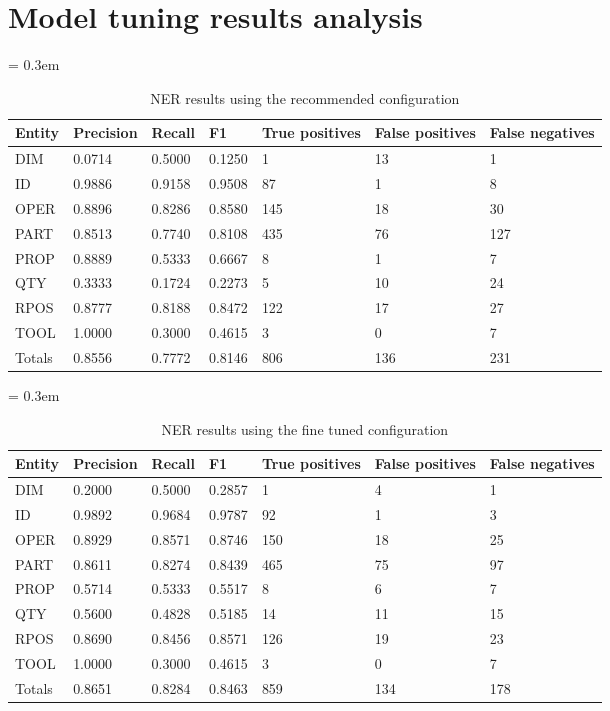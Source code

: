 \section{Model tuning results analysis}\label{sec:model-tuning-results}



\begin{table}[ht]
	\caption{NER results using the recommended configuration}
	\tabulinesep = 0.3em
	\setlength{\tabcolsep}{0.2em}
	\centering
	\begin{tabu} { X[c,m] X[r,m] X[r,m] X[r,m] X[r,m] X[r,m] X[r,m] }
		\rowfont{\bfseries\itshape} Entity & Precision & Recall & F1 & True positives & False positives & False negatives \\
		\hline
		DIM & 0.0714 & 0.5000 & 0.1250 & 1 & 13 & 1 \\
		ID & 0.9886 & 0.9158 & 0.9508 & 87 & 1 & 8 \\
		OPER & 0.8896 & 0.8286 & 0.8580 & 145 & 18 & 30 \\
		PART & 0.8513 & 0.7740 & 0.8108 & 435 & 76 & 127 \\
		PROP & 0.8889 & 0.5333 & 0.6667 & 8 & 1 & 7 \\
		QTY & 0.3333 & 0.1724 & 0.2273 & 5 & 10 & 24 \\
		RPOS & 0.8777 & 0.8188 & 0.8472 & 122 & 17 & 27 \\
		TOOL & 1.0000 & 0.3000 & 0.4615 & 3 & 0 & 7 \\
		\rowfont{\bfseries} Totals & 0.8556 & 0.7772 & 0.8146 & 806 & 136 & 231 \\
	\end{tabu}
	\label{tab:results_recommended-configuration}
\end{table}


\begin{table}[ht]
	\caption{NER results using the fine tuned configuration}
	\tabulinesep = 0.3em
	\setlength{\tabcolsep}{0.2em}
	\centering
	\begin{tabu} { X[c,m] X[r,m] X[r,m] X[r,m] X[r,m] X[r,m] X[r,m] }
		\rowfont{\bfseries\itshape} Entity & Precision & Recall & F1 & True positives & False positives & False negatives \\
		\hline
		DIM & 0.2000 & 0.5000 & 0.2857 & 1 & 4 & 1 \\
		ID & 0.9892 & 0.9684 & 0.9787 & 92 & 1 & 3 \\
		OPER & 0.8929 & 0.8571 & 0.8746 & 150 & 18 & 25 \\
		PART & 0.8611 & 0.8274 & 0.8439 & 465 & 75 & 97 \\
		PROP & 0.5714 & 0.5333 & 0.5517 & 8 & 6 & 7 \\
		QTY & 0.5600 & 0.4828 & 0.5185 & 14 & 11 & 15 \\
		RPOS & 0.8690 & 0.8456 & 0.8571 & 126 & 19 & 23 \\
		TOOL & 1.0000 & 0.3000 & 0.4615 & 3 & 0 & 7 \\
		\rowfont{\bfseries} Totals & 0.8651 & 0.8284 & 0.8463 & 859 & 134 & 178 \\
	\end{tabu}
	\label{tab:results_optimal-configuration}
\end{table}
